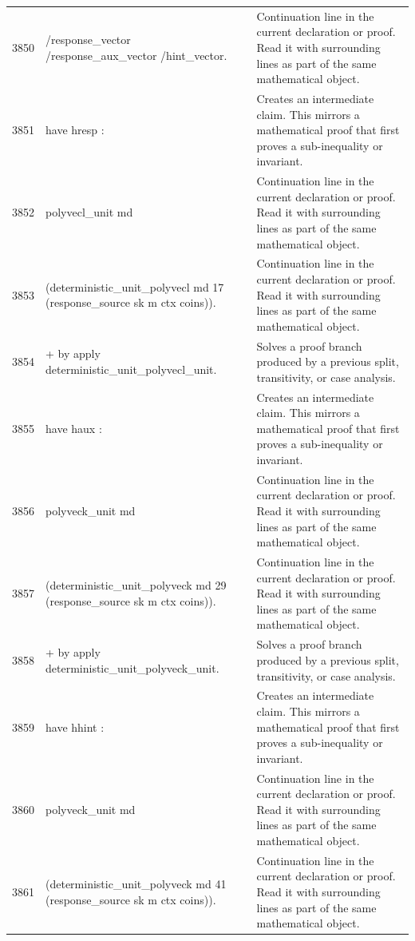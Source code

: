 \documentclass[10pt]{article}
\begin{document}
\begin{longtable}{r L{0.53\textwidth} L{0.37\textwidth}}
3850 & {\ttfamily\scriptsize         /response\_vector /response\_aux\_vector /hint\_vector.} & Continuation line in the current declaration or proof.  Read it with surrounding lines as part of the same mathematical object. \\
3851 & {\ttfamily\scriptsize have hresp :} & Creates an intermediate claim.  This mirrors a mathematical proof that first proves a sub-inequality or invariant. \\
3852 & {\ttfamily\scriptsize   polyvecl\_unit md} & Continuation line in the current declaration or proof.  Read it with surrounding lines as part of the same mathematical object. \\
3853 & {\ttfamily\scriptsize     (deterministic\_unit\_polyvecl md 17 (response\_source sk m ctx coins)).} & Continuation line in the current declaration or proof.  Read it with surrounding lines as part of the same mathematical object. \\
3854 & {\ttfamily\scriptsize + by apply deterministic\_unit\_polyvecl\_unit.} & Solves a proof branch produced by a previous split, transitivity, or case analysis. \\
3855 & {\ttfamily\scriptsize have haux :} & Creates an intermediate claim.  This mirrors a mathematical proof that first proves a sub-inequality or invariant. \\
3856 & {\ttfamily\scriptsize   polyveck\_unit md} & Continuation line in the current declaration or proof.  Read it with surrounding lines as part of the same mathematical object. \\
3857 & {\ttfamily\scriptsize     (deterministic\_unit\_polyveck md 29 (response\_source sk m ctx coins)).} & Continuation line in the current declaration or proof.  Read it with surrounding lines as part of the same mathematical object. \\
3858 & {\ttfamily\scriptsize + by apply deterministic\_unit\_polyveck\_unit.} & Solves a proof branch produced by a previous split, transitivity, or case analysis. \\
3859 & {\ttfamily\scriptsize have hhint :} & Creates an intermediate claim.  This mirrors a mathematical proof that first proves a sub-inequality or invariant. \\
3860 & {\ttfamily\scriptsize   polyveck\_unit md} & Continuation line in the current declaration or proof.  Read it with surrounding lines as part of the same mathematical object. \\
3861 & {\ttfamily\scriptsize     (deterministic\_unit\_polyveck md 41 (response\_source sk m ctx coins)).} & Continuation line in the current declaration or proof.  Read it with surrounding lines as part of the same mathematical object. \\

\end{longtable}
\end{document}
